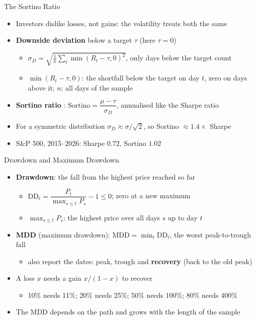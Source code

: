 \begin{frame}{The Sortino Ratio}
\itemsize{\small}
\begin{itemize}
    \item Investors dislike losses, not gains: the volatility treats both the same
    \item \textbf{Downside deviation} below a target $\tau$ (here $\tau = 0$)
    \begin{itemize}
        \item $\sigma_D = \sqrt{\frac1n \sum_t \min(R_t - \tau, 0)^2}$, only days below the target count
        \item $\min(R_t - \tau, 0)$: the shortfall below the target on day $t$, zero on days above it; $n$: all days of the sample
    \end{itemize}
    \item \textbf{Sortino ratio} : $\text{Sortino} = \dfrac{\mu - \tau}{\sigma_D}$, annualised like the Sharpe ratio
    \item For a symmetric distribution $\sigma_D \approx \sigma/\sqrt2$, so Sortino $\approx 1.4 \times$ Sharpe
    \item S\&P 500, 2015--2026: Sharpe $0.72$, Sortino $1.02$
\end{itemize}
\end{frame}

\begin{frame}{Drawdown and Maximum Drawdown}
\itemsize{\small}
\begin{itemize}
    \item \textbf{Drawdown}: the fall from the highest price reached so far
    \begin{itemize}
        \item $\text{DD}_t = \dfrac{P_t}{\max_{s \le t} P_s} - 1 \le 0$; zero at a new maximum
        \item $\max_{s \le t} P_s$: the highest price over all days $s$ up to day $t$
    \end{itemize}
    \item \textbf{MDD} (maximum drawdown): $\text{MDD} = \min_t \text{DD}_t$, the worst peak-to-trough fall
    \begin{itemize}
        \item also report the dates: peak, trough and \textbf{recovery} (back to the old peak)
    \end{itemize}
    \item A loss $x$ needs a gain $x/(1 - x)$ to recover
    \begin{itemize}
        \item 10\% needs 11\%; 20\% needs 25\%; 50\% needs 100\%; 80\% needs 400\%
    \end{itemize}
    \item The MDD depends on the path and grows with the length of the sample 
\end{itemize}
\end{frame}

